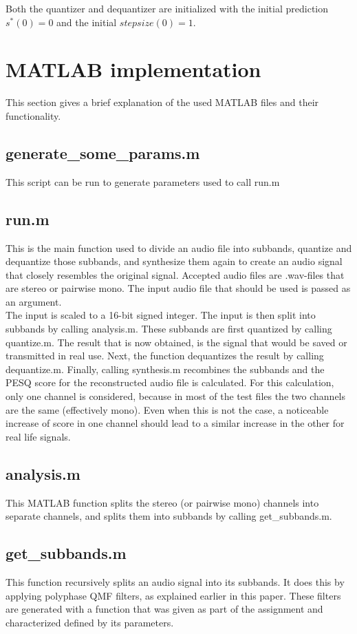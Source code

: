 \documentclass[a4paper]{article}
\begin{document}
Both the quantizer and dequantizer are initialized with the initial prediction $s^*(0) = 0$ and the initial $stepsize(0) = 1$.
\section{MATLAB implementation}
This section gives a brief explanation of the used MATLAB files and their functionality.

\subsection{generate\_some\_params.m}
This script can be run to generate parameters used to call run.m

\subsection{run.m}
This is the main function used to divide an audio file into subbands, quantize and dequantize those subbands, and synthesize them again to create an audio signal that closely resembles the original signal. Accepted audio files are .wav-files that are stereo or pairwise mono. The input audio file that should be used is passed as an argument.\\

The input is scaled to a 16-bit signed integer. The input is then split into subbands by calling analysis.m. These subbands are first quantized by calling quantize.m. The result that is now obtained, is the signal that would be saved or transmitted in real use. Next, the function dequantizes the result by calling dequantize.m. Finally, calling synthesis.m recombines the subbands and the PESQ score for the reconstructed audio file is calculated. For this calculation, only one channel is considered, because in most of the test files the two channels are the same (effectively mono). Even when this is not the case, a noticeable increase of score in one channel should lead to a similar increase in the other for real life signals.

\subsection{analysis.m}
This MATLAB function splits the stereo (or pairwise mono) channels into separate channels, and splits them into subbands by calling get\_subbands.m.

\subsection{get\_subbands.m}
This function recursively splits an audio signal into its subbands. It does this by applying polyphase QMF filters, as explained earlier in this paper. These filters are generated with a function that was given as part of the assignment and characterized defined by its parameters.\\
\end{document}
